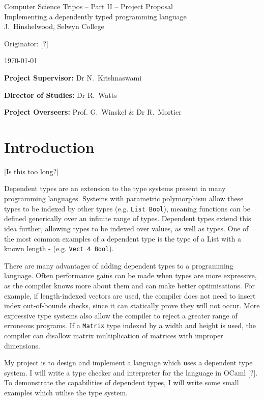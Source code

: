 \documentclass[12pt,a4paper,twoside]{article}
\begin{document}
\begin{center}
\Large
Computer Science Tripos -- Part II -- Project Proposal\\[4mm]
\LARGE
Implementing a dependently typed programming language\\[4mm]

\large
J.~Hinshelwood, Selwyn College

Originator: [?]

\today
\end{center}

\vspace{5mm}

\textbf{Project Supervisor:} Dr N.~Krishnaswami

\textbf{Director of Studies:} Dr R.~Watts

\textbf{Project Overseers:} Prof. G.~Winskel \& Dr R.~Mortier


\section*{Introduction}
[Is this too long?]

Dependent types are an extension to the type systems present in many programming languages.
Systems with parametric polymorphism allow these types to be indexed by other types (e.g. \lstinline{List Bool}), meaning functions can be defined generically over an infinite range of types.
Dependent types extend this idea further, allowing types to be indexed over values, as well as types.
One of the most common examples of a dependent type is the type of a List with a known length - (e.g. \lstinline{Vect 4 Bool}).

There are many advantages of adding dependent types to a programming language.
Often performance gains can be made when types are more expressive, as the compiler knows more about them and can make better optimisations.
For example, if length-indexed vectors are used, the compiler does not need to insert index out-of-bounds checks, since it can statically prove they will not occur.
More expressive type systems also allow the compiler to reject a greater range of erroneous programs.
If a \lstinline{Matrix} type indexed by a width and height is used, the compiler can disallow matrix multiplication of matrices with improper dimensions.

My project is to design and implement a language which uses a dependent type system.
I will write a type checker and interpreter for the language in OCaml [?].
To demonstrate the capabilities of dependent types, I will write some small examples which utilise the type system.
\end{document}
